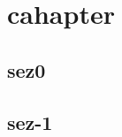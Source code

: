 
\chapter{cahapter}
\label{chp:----}

\section{sez0}
\label{sec:0}

\lipsum[1-5]


\section{sez-1}
\label{sec:1}

\lipsum[6-12]